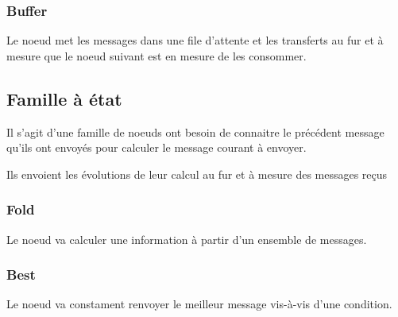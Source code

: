 \documentclass{article}
\begin{document}
\subsubsection{Buffer}
Le noeud met les messages dans une file d'attente et les transferts au fur et à
mesure que le noeud suivant est en mesure de les consommer.

\subsection{Famille à état}
Il s'agit d'une famille de noeuds ont besoin de connaitre le précédent message qu'ils
ont envoyés pour calculer le message courant à envoyer.

Ils envoient les évolutions de leur calcul au fur et à mesure des messages reçus

\subsubsection{Fold}
Le noeud va calculer une information à partir d'un ensemble de messages.

\subsubsection{Best}
Le noeud va constament renvoyer le meilleur message vis-à-vis d'une condition.
\end{document}
